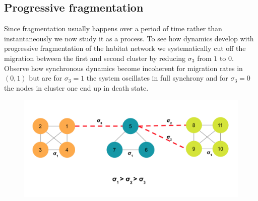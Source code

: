 \documentclass[12pt]{article}
\begin{document}
\subsection{Progressive fragmentation}
Since fragmentation usually happens over a period of time rather than instantaneously we now study it as a process. To see how dynamics develop with progressive fragmentation of the habitat network we systematically cut off the migration between the first and second cluster by reducing $\sigma_3$ from $1$ to $0$. Observe how synchronous dynamics become incoherent for migration rates in $ \left( 0,1 \right)$ but are for $\sigma_3=1$ the system oscillates in full synchrony and for $\sigma_3=0$ the nodes in cluster one end up in death state.
\begin{figure}[H]
    \centering
    \includegraphics[width=\textwidth]{Claire Section/processive.png}
\end{figure}
\end{document}
